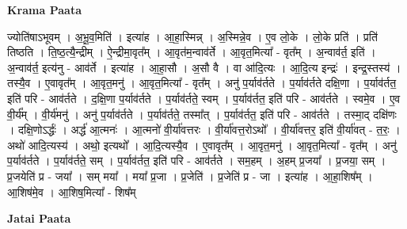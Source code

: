 \documentclass[17pt]{extarticle}
\begin{document}
\textbf{Krama Paata} \newline

ज्योति॑षाऽभूवम् । अ॒भू॒व॒मिति॑ । इत्या॑ह । आ॒हा॒स्मिन्न् । अ॒स्मिन्ने॒व । ए॒व लो॒के । लो॒के प्रति॑ । प्रति॑ तिष्ठति । ति॒ष्ठ॒त्यै॒न्द्रीम् । ऐ॒न्द्रीमा॒वृत᳚म् । आ॒वृत॑म॒न्वाव॑र्ते । आ॒वृत॒मित्या᳚ - वृत᳚म् । अ॒न्वाव॑र्त॒ इति॑ । अ॒न्वाव॑र्त॒ इत्य॑नु - आव॑र्ते । इत्या॑ह । आ॒हा॒सौ । अ॒सौ वै । वा आ॑दि॒त्यः । आ॒दि॒त्य इन्द्रः॑ । इन्द्र॒स्तस्य॑ । तस्यै॒व । ए॒वावृत᳚म् । आ॒वृत॒मनु॑ । आ॒वृत॒मित्या᳚ - वृत᳚म् । अनु॑ प॒र्याव॑र्तते । प॒र्याव॑र्तते दक्षि॒णा । प॒र्याव॑र्तत॒ इति॑ परि - आव॑र्तते । द॒क्षि॒णा प॒र्याव॑र्तते । प॒र्याव॑र्तते॒ स्वम् । प॒र्याव॑र्तत॒ इति॑ परि - आव॑र्तते । स्वमे॒व । ए॒व वी॒र्य᳚म् । वी॒र्य॑मनु॑ । अनु॑ प॒र्याव॑र्तते । प॒र्याव॑र्तते॒ तस्मा᳚त् । प॒र्याव॑र्तत॒ इति॑ परि - आव॑र्तते । तस्मा॒द् दक्षि॑णः । दक्षि॒णोऽर्द्धः॑ । अर्द्ध॑ आ॒त्मनः॑ । आ॒त्मनो॑ वी॒र्या॑वत्तरः । वी॒र्या॑वत्त॒रोऽथो᳚ । वी॒र्या॑वत्तर॒ इति॑ वी॒र्या॑वत् - त॒रः॒ । अथो॑ आदि॒त्यस्य॑ । अथो॒ इत्यथो᳚ । आ॒दि॒त्यस्यै॒व । ए॒वावृत᳚म् । आ॒वृत॒मनु॑ । आ॒वृत॒मित्या᳚ - वृत᳚म् । अनु॑ प॒र्याव॑र्तते । प॒र्याव॑र्तते॒ सम् । प॒र्याव॑र्तत॒ इति॑ परि - आव॑र्तते । सम॒हम् । अ॒हम् प्र॒जया᳚ । प्र॒जया॒ सम् । प्र॒जयेति॑ प्र - जया᳚ । सम् मया᳚ । मया᳚ प्र॒जा । प्र॒जेति॑ । प्र॒जेति॑ प्र - जा । इत्या॑ह । आ॒हा॒शिष᳚म् । आ॒शिष॑मे॒व । आ॒शिष॒मित्या᳚ - शिष᳚म् \newline

\textbf{Jatai Paata} \newline
\end{document}

